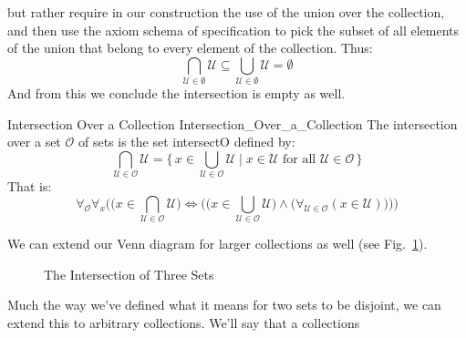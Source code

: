         but rather require in our construction the use of the union over
        the collection, and then use the axiom schema of specification to
        pick the subset of all elements of the union that belong to every
        element of the collection. Thus:
        \begin{equation}
            \bigcap_{\mathcal{U}\in\emptyset}\mathcal{U}
            \subseteq\bigcup_{\mathcal{U}\in\emptyset}\mathcal{U}
            =\emptyset
        \end{equation}
        And from this we conclude the intersection is empty as well.
        \begin{fdefinition}{Intersection Over a Collection}
                           {Intersection_Over_a_Collection}
            The \gls{intersection over a set} $\mathcal{O}$
            of sets is the set \gls{intersectO} defined by:
            \begin{equation*}
                \bigcap_{\mathcal{U}\in\mathcal{O}}\mathcal{U}
                =\Big\{\,x\in\bigcup_{\mathcal{U}\in\mathcal{O}}\mathcal{U}
                    \;\Big|\;x\in\mathcal{U}\textrm{ for all }
                    \mathcal{U}\in\mathcal{O}\,\Big\}
            \end{equation*}
            That is:
            \begin{equation*}
                \forall_{\mathcal{O}}\forall_{x}\bigg(
                    \Big(x\in\bigcap_{\mathcal{U}\in\mathcal{O}}\mathcal{U}\Big)
                    \Longleftrightarrow\Big(
                        \big(
                            x\in\bigcup_{\mathcal{U}\in\mathcal{O}}\mathcal{U}
                        \big)
                        \land\big(
                            \forall_{\mathcal{U}\in\mathcal{O}}
                            (x\in\mathcal{U})
                        \big)
                    \Big)
                \bigg)
            \end{equation*}
        \end{fdefinition}
        We can extend our Venn diagram for larger collections as well
        (see Fig.~\ref{fig:Intersection_of_Three_Sets}).
        \begin{figure}[H]
            \centering
            
            \caption{The Intersection of Three Sets}
            \label{fig:Intersection_of_Three_Sets}
        \end{figure}
        Much the way we've defined what it means for two sets to be disjoint, we
        can extend this to arbitrary collections. We'll say that a collections
